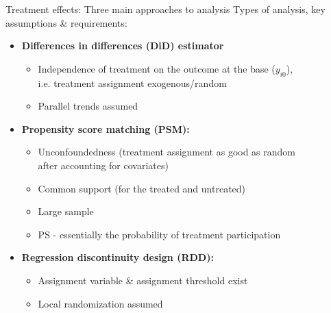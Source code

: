 \documentclass{beamer}
\begin{document}
\begin{frame}{Treatment effects: Three main approaches to analysis}
Types of analysis, key assumptions \& requirements:\\
\bigskip
\begin{itemize}
    \item \textbf{Differences in differences (DiD) estimator}\\
        \begin{itemize}
            \item Independence of treatment on the outcome at the base ($y_{i0}$), \\i.e. treatment assignment exogenous/random
            \item Parallel trends assumed
        \end{itemize}
    \bigskip
    \item \textbf{Propensity score matching (PSM):}
        \begin{itemize}
            \item Unconfoundedness (treatment assignment as good as random \\after accounting for covariates)
            \item Common support (for the treated and untreated)
            \item Large sample 
            \item PS - essentially the probability of treatment participation
        \end{itemize}
    \bigskip
    \item \textbf{Regression discontinuity design (RDD):}
        \begin{itemize}
            \item Assignment variable \& assignment threshold exist
            \item Local randomization assumed
        \end{itemize}
\end{itemize}
\end{frame}
\end{document}
